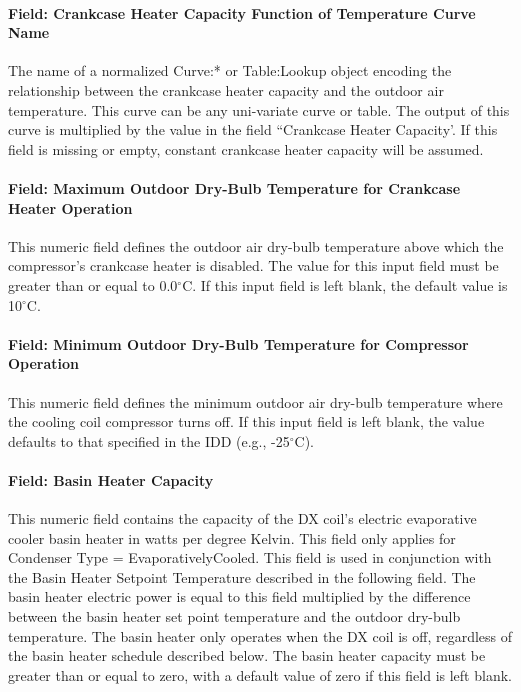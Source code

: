 \paragraph{Field: Crankcase Heater Capacity Function of Temperature Curve Name}

The name of a normalized Curve:* or Table:Lookup object encoding the relationship between the crankcase heater capacity and the outdoor air temperature. This curve can be any uni-variate curve or table. The output of this curve is multiplied by the value in the field ``Crankcase Heater Capacity'. If this field is missing or empty, constant crankcase heater capacity will be
assumed.

\paragraph{Field: Maximum Outdoor Dry-Bulb Temperature for Crankcase Heater Operation}\label{field-maximum-outdoor-dry-bulb-temperature-for-crankcase-heater-operation-2}

This numeric field defines the outdoor air dry-bulb temperature above which the compressor's crankcase heater is disabled. The value for this input field must be greater than or equal to 0.0$^\circ$C. If this input field is left blank, the default value is 10$^\circ$C.

\paragraph{Field: Minimum Outdoor Dry-Bulb Temperature for Compressor Operation}

This numeric field defines the minimum outdoor air dry-bulb temperature where the cooling coil compressor turns off. If this input field is left blank, the value defaults to that specified in the IDD (e.g., -25$^\circ$C).

\paragraph{Field: Basin Heater Capacity}\label{field-basin-heater-capacity-3-000}

This numeric field contains the capacity of the DX coil's electric evaporative cooler basin heater in watts per degree Kelvin. This field only applies for Condenser Type = EvaporativelyCooled. This field is used in conjunction with the Basin Heater Setpoint Temperature described in the following field. The basin heater electric power is equal to this field multiplied by the difference between the basin heater set point temperature and the outdoor dry-bulb temperature. The basin heater only operates when the DX coil is off, regardless of the basin heater schedule described below. The basin heater capacity must be greater than or equal to zero, with a default value of zero if this field is left blank.

